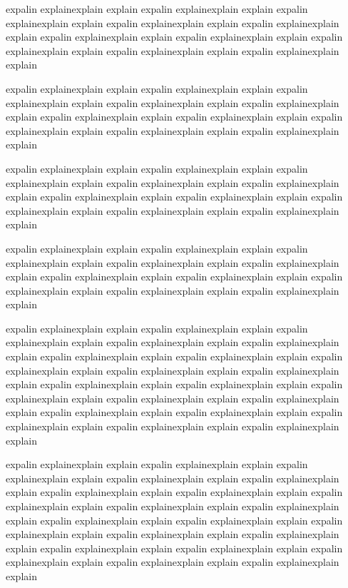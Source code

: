 {expalin explainexplain explain expalin explainexplain explain expalin explainexplain explain expalin explainexplain explain
expalin explainexplain explain expalin explainexplain explain expalin explainexplain explain expalin explainexplain explain
expalin explainexplain explain expalin explainexplain explain

expalin explainexplain explain expalin explainexplain explain expalin explainexplain explain expalin explainexplain explain
expalin explainexplain explain expalin explainexplain explain expalin explainexplain explain expalin explainexplain explain
expalin explainexplain explain expalin explainexplain explain

expalin explainexplain explain expalin explainexplain explain expalin explainexplain explain expalin explainexplain explain
expalin explainexplain explain expalin explainexplain explain expalin explainexplain explain expalin explainexplain explain
expalin explainexplain explain expalin explainexplain explain

expalin explainexplain explain expalin explainexplain explain expalin explainexplain explain expalin explainexplain explain
expalin explainexplain explain expalin explainexplain explain expalin explainexplain explain expalin explainexplain explain
expalin explainexplain explain expalin explainexplain explain

expalin explainexplain explain expalin explainexplain explain expalin explainexplain explain expalin explainexplain explain
expalin explainexplain explain expalin explainexplain explain expalin explainexplain explain expalin explainexplain explain
expalin explainexplain explain expalin explainexplain explain expalin explainexplain explain expalin explainexplain explain expalin explainexplain explain expalin explainexplain explain
expalin explainexplain explain expalin explainexplain explain expalin explainexplain explain expalin explainexplain explain
expalin explainexplain explain expalin explainexplain explain

expalin explainexplain explain expalin explainexplain explain expalin explainexplain explain expalin explainexplain explain
expalin explainexplain explain expalin explainexplain explain expalin explainexplain explain expalin explainexplain explain
expalin explainexplain explain expalin explainexplain explain
expalin explainexplain explain expalin explainexplain explain expalin explainexplain explain expalin explainexplain explain
expalin explainexplain explain expalin explainexplain explain expalin explainexplain explain expalin explainexplain explain
expalin explainexplain explain expalin explainexplain explain

}
